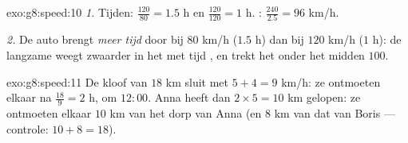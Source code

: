 \begin{solution}{exo:g8:speed:10}
\emph{1.} Tijden: $\frac{120}{80} = 1.5$ h en $\frac{120}{120} = 1$ h. : $\frac{240}{2.5} = 96$ km/h.

\emph{2.} De auto brengt \emph{meer tijd} door bij $80$ km/h ($1.5$ h) dan bij
$120$ km/h ($1$ h): de langzame  weegt zwaarder in het met tijd , en trekt het onder het midden $100$.
\end{solution}

\begin{solution}{exo:g8:speed:11}
De kloof van $18$ km sluit met $5 + 4 = 9$ km/h: ze ontmoeten elkaar na
$\frac{18}{9} = 2$ h, om $12{:}00$. Anna heeft dan $2 \times 5 = 10$ km gelopen:
ze ontmoeten elkaar $10$ km van het dorp van Anna (en $8$ km van dat van Boris ---
controle: $10 + 8 = 18$).
\end{solution}

